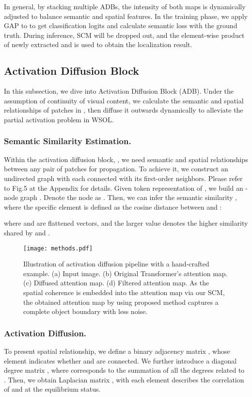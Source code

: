 \documentclass[runningheads]{llncs}
\begin{document}
In general, by stacking multiple ADBs, the intensity of both maps is dynamically adjusted to balance semantic and spatial features.
In the training phase, we apply GAP to  to get classification logits and calculate semantic loss with the ground truth. 
During inference, SCM will be dropped out, and the element-wise product of newly extracted  and  is used to obtain the localization result.



\subsection{Activation Diffusion Block}
In this subsection, we dive into Activation Diffusion Block (ADB). Under the assumption of continuity of visual content, 
we calculate the semantic and spatial relationships of patches in , then diffuse it outwards dynamically to alleviate the partial activation problem in WSOL.


\subsubsection{Semantic Similarity Estimation.} 
Within the  activation diffusion block, , we need semantic and spatial relationships between any pair of patches for propagation. To achieve it, we construct an undirected graph with each  connected with its first-order neighbors. Please refer to Fig.5 at the Appendix for details. Given token representation of , we build an -node graph . 
Denote the  node as . Then, we can infer the semantic similarity , where the specific element  is defined as the cosine distance between  and :

where  and  are flattened vectors, and the larger value  denotes the higher similarity shared by  and .

\begin{figure}[t]
\centering
\texttt{[image: methods.pdf]}
\caption{Illustration of activation diffusion pipeline with a hand-crafted example. (a) Input image. (b) Original Transformer's attention map. (c) Diffused attention map. (d) Filtered attention map. As the spatial coherence is embedded into the attention map via our SCM, the obtained attention map by using proposed method captures a complete object boundary with less noise. } 
\label{fig:methods}
\end{figure}

\subsubsection{Activation Diffusion.} 
To present spatial relationship, we define a binary adjacency matrix , whose element  indicates whether  and  are connected. We further introduce a diagonal degree matrix , where  corresponds to the summation of all the degrees related to . Then, we obtain Laplacian matrix , with each element  describes the correlation of  and  at the equilibrium status.
\end{document}
